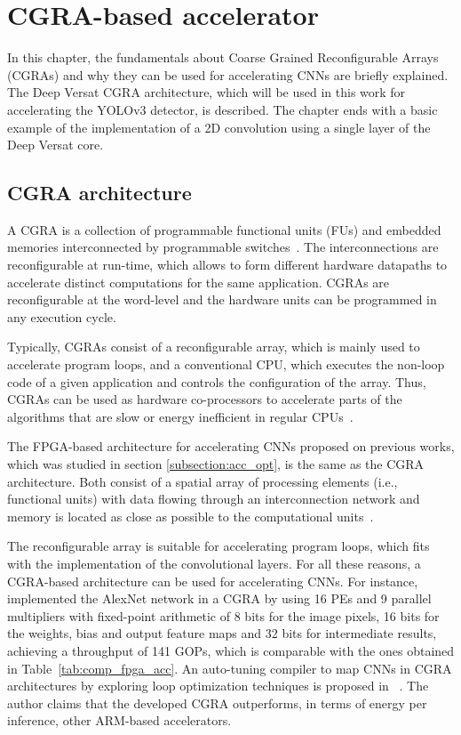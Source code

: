 \chapter{CGRA-based accelerator}
\label{chapter:cgra}

In this chapter, the fundamentals about Coarse Grained Reconfigurable Arrays
(CGRAs) and why they can be used for accelerating CNNs are briefly
explained. The Deep Versat CGRA architecture, which will be used in this work
for accelerating the YOLOv3 detector, is described. The chapter ends with a
basic example of the implementation of a 2D convolution using a single layer of
the Deep Versat core.

\section{CGRA architecture}
\label{section:cgra_arch}

A CGRA is a collection of programmable functional units (FUs) and embedded memories interconnected by programmable switches~\cite{lopes:versat}. The interconnections are reconfigurable at run-time, which allows to form different hardware datapaths to accelerate distinct computations for the same application. CGRAs are reconfigurable at the word-level and the hardware units can be programmed in any execution cycle.

Typically, CGRAs consist of a reconfigurable array, which is mainly used to accelerate program loops, and a conventional CPU, which executes the non-loop code of a given application and controls the configuration of the array. Thus, CGRAs can be used as hardware co-processors to accelerate parts of the algorithms that are slow or energy inefficient in regular CPUs~\cite{valter:deep_versat}.  

The FPGA-based architecture for accelerating CNNs proposed on previous works, which was studied in section \ref{subsection:acc_opt}, is the same as the CGRA architecture. Both consist of a spatial array of processing elements (i.e., functional units) with data flowing through an interconnection network and memory is located as close as possible to the computational units~\cite{auto_tuning_cgra}. 

The reconfigurable array is suitable for accelerating program loops, which fits with the implementation of the convolutional layers. For all these reasons, a CGRA-based architecture can be used for accelerating CNNs. For instance,~\cite{alexnet_cgra} implemented the AlexNet network in a CGRA by using 16 PEs and 9 parallel multipliers with fixed-point arithmetic of 8 bits for the image pixels, 16 bits for the weights, bias and output feature maps and 32 bits for intermediate results, achieving a throughput of 141 GOPs, which is comparable with the ones obtained in Table~\ref{tab:comp_fpga_acc}. An auto-tuning compiler to map CNNs in CGRA architectures by exploring loop optimization techniques is proposed in~\cite{auto_tuning_cgra} . The author claims that the developed CGRA outperforms, in terms of energy per inference, other ARM-based accelerators.

